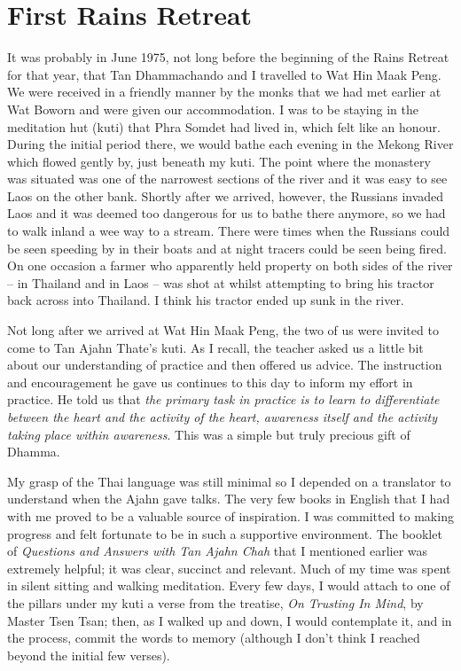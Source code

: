 \chapter{First Rains Retreat}

It was probably in June 1975, not long before the beginning of the Rains
Retreat for that year, that Tan Dhammachando and I travelled to Wat Hin
Maak Peng. We were received in a friendly manner by the monks that we
had met earlier at Wat Boworn and were given our accommodation. I was to
be staying in the meditation hut (kuti) that Phra Somdet had lived in,
which felt like an honour. During the initial period there, we would
bathe each evening in the Mekong River which flowed gently by, just
beneath my kuti. The point where the monastery was situated was one of
the narrowest sections of the river and it was easy to see Laos on the
other bank. Shortly after we arrived, however, the Russians invaded Laos
and it was deemed too dangerous for us to bathe there anymore, so we had
to walk inland a wee way to a stream. There were times when the Russians
could be seen speeding by in their boats and at night tracers could be
seen being fired. On one occasion a farmer who apparently held property
on both sides of the river -- in Thailand and in Laos -- was shot at
whilst attempting to bring his tractor back across into Thailand. I
think his tractor ended up sunk in the river.

Not long after we arrived at Wat Hin Maak Peng, the two of us were
invited to come to Tan Ajahn Thate's kuti. As I recall, the teacher
asked us a little bit about our understanding of practice and then
offered us advice. The instruction and encouragement he gave us
continues to this day to inform my effort in practice. He told us that
\emph{the primary task in practice is to learn to differentiate between
the heart and the activity of the heart, awareness itself and the
activity taking place within awareness}. This was a simple but truly
precious gift of Dhamma.

My grasp of the Thai language was still minimal so I depended on a
translator to understand when the Ajahn gave talks. The very few books
in English that I had with me proved to be a valuable source of
inspiration. I was committed to making progress and felt fortunate to be
in such a supportive environment. The booklet of \emph{Questions and
Answers with Tan Ajahn Chah} that I mentioned earlier was extremely
helpful; it was clear, succinct and relevant. Much of my time was spent
in silent sitting and walking meditation. Every few days, I would attach
to one of the pillars under my kuti a verse from the treatise, \emph{On
Trusting In Mind}, by Master Tsen Tsan; then, as I walked up and down, I
would contemplate it, and in the process, commit the words to memory
(although I don't think I reached beyond the initial few verses).

